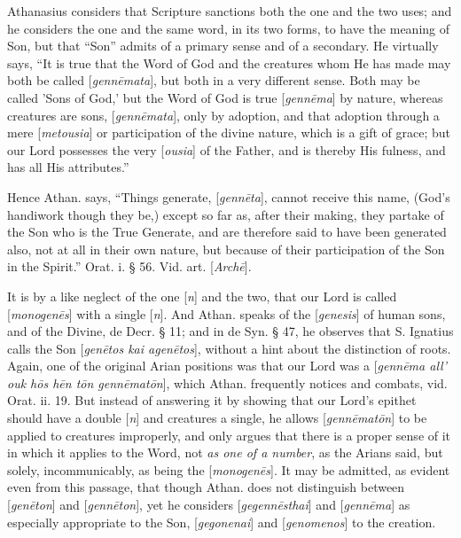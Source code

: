 Athanasius considers that Scripture sanctions
both the one and the two uses; and he considers the one and the same
word, in its two forms, to have the meaning of Son, but that “Son”
admits of a primary sense and of a secondary. He virtually says, “It
is true that the Word of God and the creatures whom He has made may
both be called [\emph{genn\={e}mata}], but both in a very different
sense. Both may be called 'Sons of God,' but the Word of God is true [\emph{genn\={e}ma}]
by nature, whereas creatures are sons, [\emph{genn\={e}mata}], only
by adoption, and that adoption through a mere [\emph{metousia}]
or participation of the divine nature, which is a gift of grace; but
our Lord possesses the very [\emph{ousia}] of the Father, and is
thereby His fulness, and has all His attributes.”

Hence Athan. says, “Things generate, [\emph{genn\={e}ta}],
cannot receive this name, (God’s handiwork though they be,) except
so far as, after their making, they partake of the Son who is the True
Generate, and are therefore said to have been generated also, not at
all in their own nature, but because of their participation of the Son
in the Spirit.” Orat. i. § 56. Vid. art. [\emph{Arch\={e}}].

It is by a like neglect of the one [\emph{n}] and
the two, that our Lord is called [\emph{monogen\={e}s}] with a
single [\emph{n}]. And Athan. speaks of the [\emph{genesis}] of human
sons, and of the Divine, de Decr. § 11; and in de Syn. § 47, he
observes that S. Ignatius calls the Son [\emph{gen\={e}tos kai agen\={e}tos}],
without a hint about the distinction of roots. Again, one of the
original Arian positions was that our Lord was a [\emph{genn\={e}ma
all' ouk h\={o}s h\={e}n
t\={o}n genn\={e}mat\={o}n}], which Athan.
frequently notices and combats, vid. Orat. ii. 19. But instead of
answering it by showing that our Lord’s epithet should have a double
[\emph{n}] and creatures a single, he allows [\emph{genn\={e}mat\={o}n}]
to be applied to creatures improperly, and only argues that there is a
proper sense of it in which it applies to the Word, not \emph{as one of a
number}, as the Arians said, but solely, incommunicably, as being
the [\emph{monogen\={e}s}]. It may be admitted, as evident even
from this passage, that though Athan. does not distinguish between [\emph{gen\={e}ton}]
and [\emph{genn\={e}ton}],
yet he considers [\emph{gegenn\={e}sthai}] and [\emph{genn\={e}ma}]
as especially appropriate to the Son, [\emph{gegonenai}] and [\emph{genomenos}]
to the creation.

